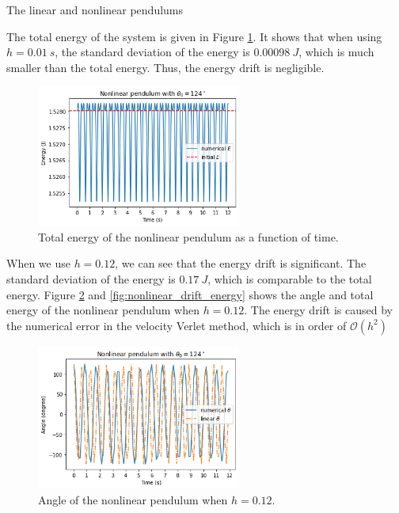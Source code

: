 \documentclass{article}
\begin{document}
\begin{section}{The linear and nonlinear pendulums}
\begin{enumerate}[1.]
\begin{tcolorbox}[breakable]
		The total energy of the system is given in Figure \ref{fig:nonlinear_energy}. It shows that when using $h = \SI{0.01}{s}$, the standard deviation of the energy is $\SI{0.00098}{J}$, which is much smaller than the total energy. Thus, the energy drift is negligible. 

		\begin{figure}[H]
			\centering
			\includegraphics[width=0.6\textwidth]{images/nonlinear_energy.png}
			\caption{Total energy of the nonlinear pendulum as a function of time.}
			\label{fig:nonlinear_energy}
		\end{figure}

		When we use $h = 0.12$, we can see that the energy drift is significant. The standard deviation of the energy is $\SI{0.17}{J}$, which is comparable to the total energy. Figure \ref{fig:nonlinear_drift_theta} and \ref{fig:nonlinear_drift_energy} shows the angle and total energy of the nonlinear pendulum when $h = 0.12$. The energy drift is caused by the numerical error in the velocity Verlet method, which is in order of $\mathcal{O}(h^2)$

		\begin{figure}[H]
			\centering
			\includegraphics[width=0.6\textwidth]{images/nonlinear_drift_theta.png}
			\caption{Angle of the nonlinear pendulum when $h = 0.12$.}
			\label{fig:nonlinear_drift_theta}
		\end{figure}


\end{tcolorbox}
\end{enumerate}
\end{section}
\end{document}
